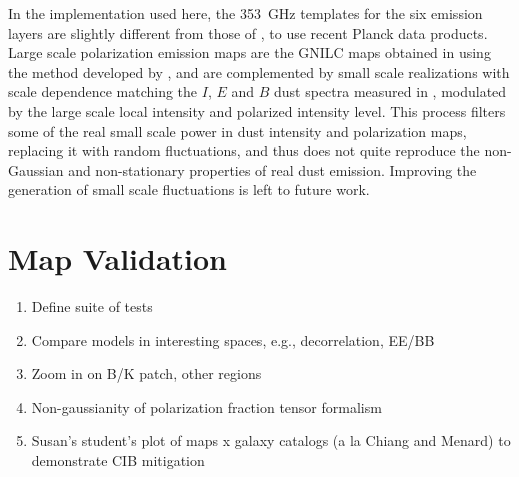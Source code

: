 \documentclass[twocolumn]{aastex631}
\begin{document}
In the implementation used here, the 353~GHz templates for the six emission layers are slightly different from those of \cite{Martinez-Solaeche:2018}, to use recent Planck data products. Large scale polarization emission maps are the GNILC maps obtained in \cite{planck2016-l04} using the method developed by \cite{2011MNRAS.418..467R}, and are complemented by small scale realizations with scale dependence matching the $I$, $E$ and $B$ dust spectra measured in \cite{planck2016-l11A}, modulated by the large scale local intensity and polarized intensity level. This process filters some of the real small scale power in dust intensity and polarization maps, replacing it with random fluctuations, and thus does not quite reproduce the non-Gaussian and non-stationary properties of real dust emission. Improving the generation of small scale fluctuations is left to future work.


\section{Map Validation} \label{sec:validation}
\begin{enumerate}
    \item Define suite of tests
    \item Compare models in interesting spaces, e.g., decorrelation, EE/BB
    \item Zoom in on B/K patch, other regions
    \item Non-gaussianity of polarization fraction tensor formalism
    \item Susan's student's plot of maps x galaxy catalogs (a la Chiang and Menard) to demonstrate CIB mitigation
\end{enumerate}
\end{document}
